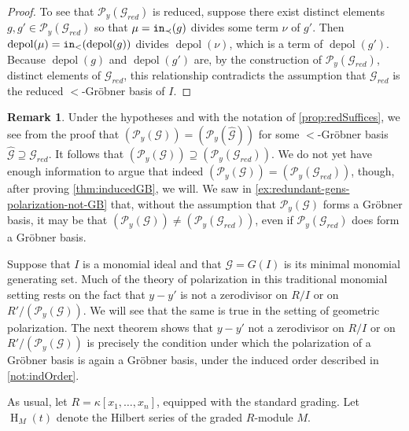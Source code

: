 \documentclass[12pt, reqno]{amsart}
\numberwithin{equation}{section}
\newtheorem{Main Conjecture}[theorem]{Main Conjecture}
\theoremstyle{definition}
\newtheorem{remark}[theorem]{Remark}
\theoremstyle{plain}
\newcommand{\init}{{\tt in}}
\newcommand{\G}{\mathcal{G}}
\renewcommand{\P}{\mathcal{P}}
\DeclareMathOperator{\depol}{depol}
\DeclareMathOperator{\HS}{H}
\begin{document}
\begin{proof}
To see that $\P_y(\G_{red})$ is reduced, suppose there exist distinct elements $g, g' \in \P_y(\G_{red})$ so that $\mu = \init_\prec(g)$ divides some term $\nu$ of $g'$.  Then $\depol(\mu) = \init_<(\depol(g))$ divides $\depol(\nu)$, which is a term of $\depol(g')$.  Because  $\depol(g)$ and $\depol(g')$ are, by the construction of $\P_y(\G_{red})$, distinct elements of $\G_{red}$, this relationship contradicts the assumption that $\G_{red}$ is the reduced $<$-Gr\"obner basis of $I$.
\end{proof}


\begin{remark}\label{rem:polarization-generates-same-ideal-as-reducedGBpolarization}
    Under the hypotheses and with the notation of \cref{prop:redSuffices}, we see from the proof that $(\P_y(\G)) = (\P_y(\hat{\G}))$ for some $<$-Gr\"obner basis $\hat{\G} \supseteq \G_{red}$. It follows that $(\P_y(\G)) \supseteq  (\P_y(\G_{red}))$. We do not yet have enough information to argue that indeed $(\P_y(\G)) = (\P_y(\G_{red}))$, though, after proving \cref{thm:inducedGB}, we will.  We saw in \cref{ex:redundant-gens-polarization-not-GB} that, without the assumption that $\P_y(\G)$ forms a Gr\"obner basis, it may be that $(\P_y(\G)) \neq (\P_y(\G_{red}))$, even if $\P_y(\G_{red})$ does form a Gr\"obner basis.
\end{remark}



Suppose that $I$ is a monomial ideal and that $\G = G(I)$ is its minimal monomial generating set. Much of the theory of polarization in this traditional monomial setting rests on the fact that $y-y'$ is not a zerodivisor on $R/I$ or on $R'/(\P_y(\G))$. We will see that the same is true in the setting of geometric polarization.  The next theorem shows that $y-y'$ not a zerodivisor on $R/I$ or on $R'/(\P_y(\G))$ is precisely the condition under which the polarization of a Gr\"obner basis is again a Gr\"obner basis, under the induced order described in \cref{not:indOrder}.


As usual, let $R = \kappa[x_1, \ldots, x_n]$, equipped with the standard grading. Let $\HS_M(t)$ denote the Hilbert series of the graded $R$-module $M$.
\end{document}
